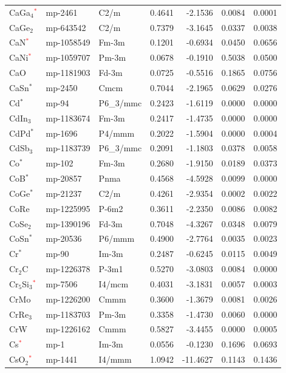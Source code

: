 \begin{longtable}{@{}lllrrrr@{}}
CaGa$_{4}$\textcolor{red}{$^*$} & mp-2461 & C2/m & 0.4641 & -2.1536 & 0.0084 & 0.0001 \\
CaGe$_{2}$ & mp-643542 & C2/m & 0.7379 & -3.1645 & 0.0337 & 0.0038 \\
CaN\textcolor{red}{$^*$} & mp-1058549 & Fm-3m & 0.1201 & -0.6934 & 0.0450 & 0.0656 \\
CaNi\textcolor{red}{$^*$} & mp-1059707 & Pm-3m & 0.0678 & -0.1910 & 0.5038 & 0.0500 \\
CaO & mp-1181903 & Fd-3m & 0.0725 & -0.5516 & 0.1865 & 0.0756 \\
CaSn$^*$ & mp-2450 & Cmcm & 0.7044 & -2.1965 & 0.0629 & 0.0276 \\
Cd$^*$ & mp-94 & P6\_3/mmc & 0.2423 & -1.6119 & 0.0000 & 0.0000 \\
CdIn$_{3}$ & mp-1183674 & Fm-3m & 0.2417 & -1.4735 & 0.0000 & 0.0000 \\
CdPd$^*$ & mp-1696 & P4/mmm & 0.2022 & -1.5904 & 0.0000 & 0.0004 \\
CdSb$_{3}$ & mp-1183739 & P6\_3/mmc & 0.2091 & -1.1803 & 0.0378 & 0.0058 \\
Co$^*$ & mp-102 & Fm-3m & 0.2680 & -1.9150 & 0.0189 & 0.0373 \\
CoB$^*$ & mp-20857 & Pnma & 0.4568 & -4.5928 & 0.0099 & 0.0000 \\
CoGe$^*$ & mp-21237 & C2/m & 0.4261 & -2.9354 & 0.0002 & 0.0022 \\
CoRe & mp-1225995 & P-6m2 & 0.3611 & -2.2350 & 0.0086 & 0.0082 \\
CoSe$_{2}$ & mp-1390196 & Fd-3m & 0.7048 & -4.3267 & 0.0348 & 0.0079 \\
CoSn$^*$ & mp-20536 & P6/mmm & 0.4900 & -2.7764 & 0.0035 & 0.0023 \\
Cr$^*$ & mp-90 & Im-3m & 0.2487 & -0.6245 & 0.0115 & 0.0049 \\
Cr$_{2}$C & mp-1226378 & P-3m1 & 0.5270 & -3.0803 & 0.0084 & 0.0000 \\
Cr$_{5}$Si$_{3}$\textcolor{red}{$^*$} & mp-7506 & I4/mcm & 0.4031 & -3.1831 & 0.0057 & 0.0003 \\
CrMo & mp-1226200 & Cmmm & 0.3600 & -1.3679 & 0.0081 & 0.0026 \\
CrRe$_{3}$ & mp-1183703 & Pm-3m & 0.3358 & -1.4730 & 0.0060 & 0.0000 \\
CrW & mp-1226162 & Cmmm & 0.5827 & -3.4455 & 0.0000 & 0.0005 \\
Cs\textcolor{red}{$^*$} & mp-1 & Im-3m & 0.0556 & -0.1230 & 0.1696 & 0.0693 \\
CsO$_{2}$\textcolor{red}{$^*$} & mp-1441 & I4/mmm & 1.0942 & -11.4627 & 0.1143 & 0.1436 \\

\end{longtable}
